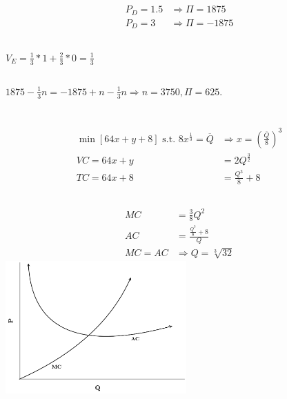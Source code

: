 \documentclass{article}
\begin{document}
	\subsection[d]{}
		\begin{align*}
			P_D = 1.5 & \Rightarrow \Pi = 1875\\
			P_D = 3 & \Rightarrow \Pi = -1875
		\end{align*}
	\subsection[e]{}
		$ V_E = \frac{1}{3} * 1 + \frac{2}{3} * 0 = \frac{1}{3} $
	\subsection[f]{}
		$ 1875 - \frac{1}{3} n = -1875 + n - \frac{1}{3} n \Rightarrow n = 3750, \Pi = 625.$
\section[3]{}
	\subsection[a]{}
		\begin{align*}
			\min[64x+y+8]  \textrm{ s.t. }  8x^{\frac{1}{3}} = \overline{Q} & \Rightarrow x =\left ( \frac{\overline{Q}}{8} \right ) ^3 \\
			VC = 64x + y &= 2Q^{\frac{3}{2}} \\
			TC = 64x+8 &= \frac{Q^3}{8}+8
		\end{align*}	
	\subsection[b]{}
		\begin{align*}
			MC &= \frac{3}{8}Q^2 \\
			AC &= \frac{\frac{Q^3}{8}+8}{Q}\\
			MC = AC & \Rightarrow Q = \sqrt[3]{32}
		\end{align*}
		\includegraphics[height=2in]{Charts/3b}
\end{document}
